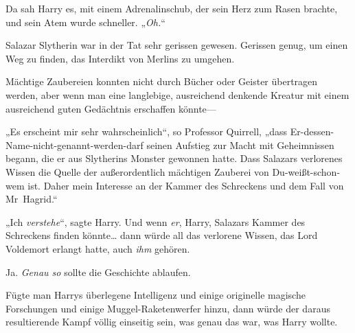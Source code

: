 Da sah Harry es, mit einem Adrenalinschub, der sein Herz zum Rasen brachte, und sein Atem wurde schneller. „\emph{Oh.}“

Salazar Slytherin war in der Tat sehr gerissen gewesen. Gerissen genug, um einen Weg zu finden, das Interdikt von Merlins zu umgehen.

Mächtige Zaubereien konnten nicht durch Bücher oder Geister übertragen werden, aber wenn man eine langlebige, ausreichend denkende Kreatur mit einem ausreichend guten Gedächtnis erschaffen könnte—

„Es erscheint mir sehr wahrscheinlich“, so Professor Quirrell, „dass Er-dessen-Name-nicht-genannt-werden-darf seinen Aufstieg zur Macht mit Geheimnissen begann, die er aus Slytherins Monster gewonnen hatte. Dass Salazars verlorenes Wissen die Quelle der außerordentlich mächtigen Zauberei von Du-weißt-schon-wem ist. Daher mein Interesse an der Kammer des Schreckens und dem Fall von Mr~Hagrid.“

„Ich \emph{verstehe}“, sagte Harry. Und wenn \emph{er}, Harry, Salazars Kammer des Schreckens finden könnte… dann würde all das verlorene Wissen, das Lord Voldemort erlangt hatte, auch \emph{ihm} gehören.

Ja. \emph{Genau so} sollte die Geschichte ablaufen.

Fügte man Harrys überlegene Intelligenz und einige originelle magische Forschungen und einige Muggel-Raketenwerfer hinzu, dann würde der daraus resultierende Kampf völlig einseitig sein, was genau das war, was Harry wollte.

